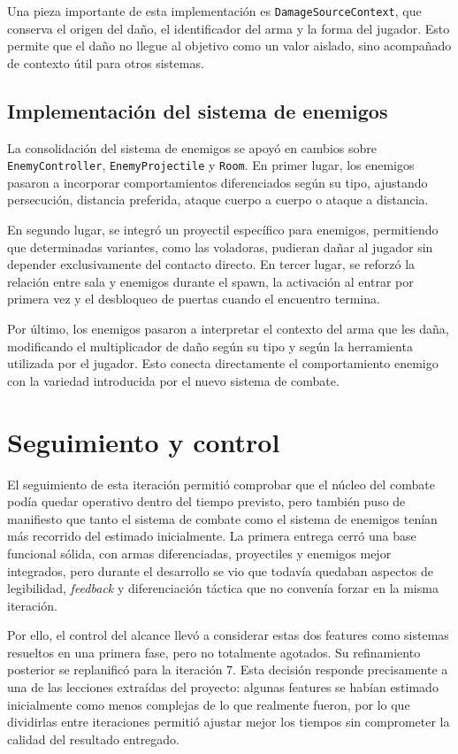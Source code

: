 Una pieza importante de esta implementación es \texttt{DamageSourceContext}, que conserva el
origen del daño, el identificador del arma y la forma del jugador. Esto permite que el daño
no llegue al objetivo como un valor aislado, sino acompañado de contexto útil para otros
sistemas.

\subsection{Implementación del sistema de enemigos}
La consolidación del sistema de enemigos se apoyó en cambios sobre \texttt{EnemyController},
\texttt{EnemyProjectile} y \texttt{Room}. En primer lugar, los enemigos pasaron a incorporar
comportamientos diferenciados según su tipo, ajustando persecución, distancia preferida,
ataque cuerpo a cuerpo o ataque a distancia.

En segundo lugar, se integró un proyectil específico para enemigos, permitiendo que
determinadas variantes, como las voladoras, pudieran dañar al jugador sin depender
exclusivamente del contacto directo. En tercer lugar, se reforzó la relación entre sala y
enemigos durante el spawn, la activación al entrar por primera vez y el desbloqueo de
puertas cuando el encuentro termina.

Por último, los enemigos pasaron a interpretar el contexto del arma que les daña,
modificando el multiplicador de daño según su tipo y según la herramienta utilizada por el
jugador. Esto conecta directamente el comportamiento enemigo con la variedad introducida por
el nuevo sistema de combate.

\section{Seguimiento y control}
El seguimiento de esta iteración permitió comprobar que el núcleo del combate podía quedar
operativo dentro del tiempo previsto, pero también puso de manifiesto que tanto el sistema de
combate como el sistema de enemigos tenían más recorrido del estimado inicialmente. La primera
entrega cerró una base funcional sólida, con armas diferenciadas, proyectiles y enemigos mejor
integrados, pero durante el desarrollo se vio que todavía quedaban aspectos de legibilidad,
\textit{feedback} y diferenciación táctica que no convenía forzar en la misma iteración.

Por ello, el control del alcance llevó a considerar estas dos features como sistemas resueltos
en una primera fase, pero no totalmente agotados. Su refinamiento posterior se replanificó para
la iteración 7. Esta decisión responde precisamente a una de las lecciones extraídas del
proyecto: algunas features se habían estimado inicialmente como menos complejas de lo que
realmente fueron, por lo que dividirlas entre iteraciones permitió ajustar mejor los tiempos sin
comprometer la calidad del resultado entregado.

